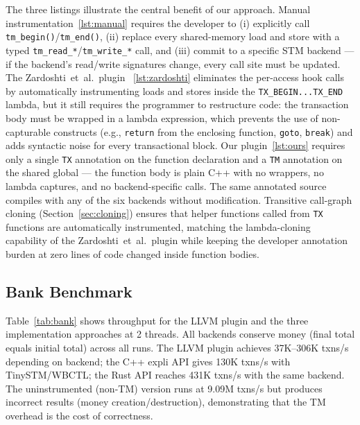 \documentclass[article,12pt]{article}
\newcommand{\ZardoshtiEtAl}{Zardoshti~et~al.}
\begin{document}
The three listings illustrate the central benefit of our approach.
Manual instrumentation~\ref{lst:manual} requires the developer to (i)
explicitly call \texttt{tm\_begin()}/\texttt{tm\_end()}, (ii) replace
every shared-memory load and store with a typed
\texttt{tm\_read\_*}/\texttt{tm\_write\_*} call, and (iii) commit to a
specific STM backend --- if the backend's read/write signatures change,
every call site must be updated.  The \ZardoshtiEtAl\ plugin
~\ref{lst:zardoshti} eliminates the per-access hook calls by
automatically instrumenting loads and stores inside the
\texttt{TX\_BEGIN...TX\_END} lambda, but it still requires the
programmer to restructure code: the transaction body must be wrapped in
a lambda expression, which prevents the use of non-capturable
constructs (e.g., \texttt{return} from the enclosing function,
\texttt{goto}, \texttt{break}) and adds syntactic noise for every
transactional block.  Our plugin~\ref{lst:ours} requires only a single
\texttt{TX} annotation on the function declaration and a \texttt{TM}
annotation on the shared global --- the function body is plain C++ with
no wrappers, no lambda captures, and no backend-specific calls.  The
same annotated source compiles with any of the six backends without
modification.  Transitive call-graph cloning (Section~\ref{sec:cloning})
ensures that helper functions called from \texttt{TX} functions are
automatically instrumented, matching the lambda-cloning capability of the
\ZardoshtiEtAl\ plugin while keeping the developer annotation burden at
zero lines of code changed inside function bodies.

\subsection{Bank Benchmark}

Table~\ref{tab:bank} shows throughput for the LLVM plugin and the three
implementation approaches at 2 threads.  All backends conserve money
(final total equals initial total) across all runs.  The LLVM plugin
achieves 37K--306K txns/s depending on backend; the C++ expli API gives
130K txns/s with TinySTM/WBCTL; the Rust API reaches 431K txns/s with
the same backend.  The uninstrumented (non-TM) version runs at 9.09M
txns/s but produces incorrect results (money creation/destruction),
demonstrating that the TM overhead is the cost of correctness.
\end{document}

